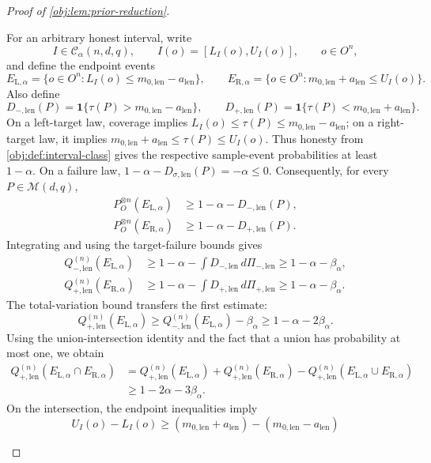\begin{proof}[Proof of \cref{obj:lem:prior-reduction}]
\begin{enumerate}
For an arbitrary honest interval, write
\[
I\in\mathcal C_\alpha(n,d,q),
\qquad
I(o)=[L_I(o),U_I(o)],
\qquad o\in O^n,
\]
and define the endpoint events
\[
E_{\mathrm L,\alpha}
=\{o\in O^n:L_I(o)\le m_{0,\mathrm{len}}-a_{\mathrm{len}}\},
\qquad
E_{\mathrm R,\alpha}
=\{o\in O^n:m_{0,\mathrm{len}}+a_{\mathrm{len}}\le U_I(o)\}.
\]
Also define
\[
D_{-,\mathrm{len}}(P)
=\mathbf1\{\tau(P)>m_{0,\mathrm{len}}-a_{\mathrm{len}}\},
\qquad
D_{+,\mathrm{len}}(P)
=\mathbf1\{\tau(P)<m_{0,\mathrm{len}}+a_{\mathrm{len}}\}.
\]
On a left-target law, coverage implies
\(L_I(o)\le\tau(P)\le m_{0,\mathrm{len}}-a_{\mathrm{len}}\);
on a right-target law, it implies
\(m_{0,\mathrm{len}}+a_{\mathrm{len}}\le\tau(P)\le U_I(o)\).
Thus honesty from \cref{obj:def:interval-class} gives the respective
sample-event probabilities at least \(1-\alpha\).
On a failure law, \(1-\alpha-D_{\sigma,\mathrm{len}}(P)=-\alpha\le0\).
Consequently, for every \(P\in\mathcal M(d,q)\),
\[
\begin{aligned}
P_O^{\otimes n}(E_{\mathrm L,\alpha})
&\ge1-\alpha-D_{-,\mathrm{len}}(P),\\
P_O^{\otimes n}(E_{\mathrm R,\alpha})
&\ge1-\alpha-D_{+,\mathrm{len}}(P).
\end{aligned}
\]
Integrating and using the target-failure bounds gives
\[
\begin{aligned}
Q_{-,\mathrm{len}}^{(n)}(E_{\mathrm L,\alpha})
&\ge1-\alpha-\int D_{-,\mathrm{len}}\,d\Pi_{-,\mathrm{len}}
 \ge1-\alpha-\beta_\alpha,\\
Q_{+,\mathrm{len}}^{(n)}(E_{\mathrm R,\alpha})
&\ge1-\alpha-\int D_{+,\mathrm{len}}\,d\Pi_{+,\mathrm{len}}
 \ge1-\alpha-\beta_\alpha.
\end{aligned}
\]
The total-variation bound transfers the first estimate:
\[
Q_{+,\mathrm{len}}^{(n)}(E_{\mathrm L,\alpha})
\ge Q_{-,\mathrm{len}}^{(n)}(E_{\mathrm L,\alpha})-\beta_\alpha
\ge1-\alpha-2\beta_\alpha.
\]
Using the union-intersection identity and the fact that a union has
probability at most one, we obtain
\[
\begin{aligned}
Q_{+,\mathrm{len}}^{(n)}
 (E_{\mathrm L,\alpha}\cap E_{\mathrm R,\alpha})
&=
Q_{+,\mathrm{len}}^{(n)}(E_{\mathrm L,\alpha})
+Q_{+,\mathrm{len}}^{(n)}(E_{\mathrm R,\alpha})
-Q_{+,\mathrm{len}}^{(n)}
 (E_{\mathrm L,\alpha}\cup E_{\mathrm R,\alpha})\\
&\ge1-2\alpha-3\beta_\alpha.
\end{aligned}
\]
On the intersection, the endpoint inequalities imply
\[
U_I(o)-L_I(o)
\ge (m_{0,\mathrm{len}}+a_{\mathrm{len}})
   -(m_{0,\mathrm{len}}-a_{\mathrm{len}})
\]
\end{enumerate}
\end{proof}
